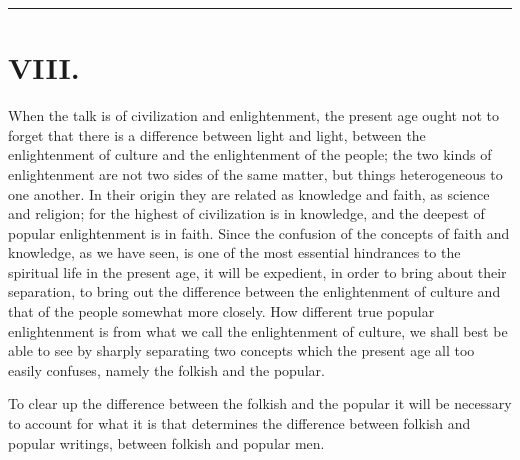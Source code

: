 \documentclass[12pt]{book}
\newcommand{\opage}[1]{\marginnote{\footnotesize\textit{[#1]}}}
\begin{document}
\begin{center}\rule{3cm}{0.4pt}\end{center}

\chapter*{VIII.}
\label{ch:viii}
\opage{119}\setcounter{footnote}{0}%
When the talk is of civilization and enlightenment, the present age ought
not to forget that there is a difference between light and light, between
the enlightenment of culture and the enlightenment of the people; the two
kinds of enlightenment are not two sides of the same matter, but things
heterogeneous to one another. In their origin they are related as
knowledge and faith, as science and religion; for the highest of
civilization is in knowledge, and the deepest of popular enlightenment is
in faith. Since the confusion of the concepts of faith and knowledge, as
we have seen, is one of the most essential hindrances to the spiritual
life in the present age, it will be expedient, in order to bring about
their separation, to bring out the difference between the enlightenment
of culture and that of the people somewhat more closely. How different
true popular enlightenment is from what we call the enlightenment of
culture, we shall best be able to see by sharply separating two concepts
which the present age all too easily confuses, namely the folkish and the
popular.

To clear up the difference between the folkish and the popular it will
be necessary to account for what it is that determines the difference
between folkish and popular writings, between folkish and popular men.
\end{document}
